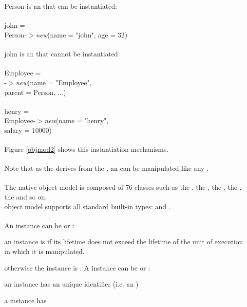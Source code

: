 \\
\\
\textsf{Person} is an  that can be instantiated:
\\
\\
\ixx {} \textsf{john} =\\
\ixy  \textsf{Person}-$>$\emph{new}(name = "john", age = 32)
\\
\\
\textsf{john} is an  that cannot be instantiated
\\
\\
\ixx{} \textsf{Employee} =\\
\ixy  {}-$>$\emph{new}(name = "Employee",\\
\ixy   parent = \textsf{Person}, ...)
\\
\\
\ixx {} \textsf{henry} =\\
\ixy  \textsf{Employee}-$>$\emph{new}(name = "henry",\\
\ixy  salary = 10000)
\\
\\
Figure \ref{objmod2} shows this instantiation mechanisms.
\\
\\
Note that as the  derives from the ,
an  can be manipulated like any .
\\
\\
The native \eyedb object model is composed of 76 classes
such as the , the ,
the , the , the 
and so on.
\\
\eyedb object model supports all standard built-in types:
 and .
\\
\\
An instance can be  or :
\bi
\item an instance is  if its lifetime does not exceed the
lifetime of the unit of execution in which it is manipulated.
\item otherwise the instance is .
\ei
A  instance can be  or :
\bi
\item an   instance has an unique identifier
(i.e. an \oidx)
\item a   instance has
